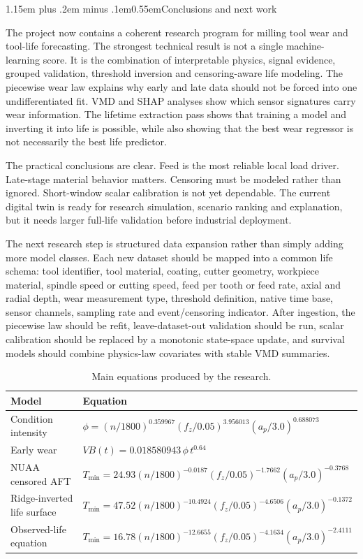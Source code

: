 \documentclass[10pt]{article}
\makeatletter
\newcommand{\vb}{V\!B}
\newcommand{\phii}{\phi}
\renewcommand\section{\@startsection{section}{1}{0pt}%
  {1.15em plus .2em minus .1em}{0.55em}{\normalfont\normalsize\bfseries}}
\makeatother
\begin{document}
\section{Conclusions and next work}

The project now contains a coherent research program for milling tool wear and tool-life forecasting. The strongest technical result is not a single machine-learning score. It is the combination of interpretable physics, signal evidence, grouped validation, threshold inversion and censoring-aware life modeling. The piecewise wear law explains why early and late data should not be forced into one undifferentiated fit. VMD and SHAP analyses show which sensor signatures carry wear information. The lifetime extraction pass shows that training a model and inverting it into life is possible, while also showing that the best wear regressor is not necessarily the best life predictor.

The practical conclusions are clear. Feed is the most reliable local load driver. Late-stage material behavior matters. Censoring must be modeled rather than ignored. Short-window scalar calibration is not yet dependable. The current digital twin is ready for research simulation, scenario ranking and explanation, but it needs larger full-life validation before industrial deployment.

The next research step is structured data expansion rather than simply adding more model classes. Each new dataset should be mapped into a common life schema: tool identifier, tool material, coating, cutter geometry, workpiece material, spindle speed or cutting speed, feed per tooth or feed rate, axial and radial depth, wear measurement type, threshold definition, native time base, sensor channels, sampling rate and event/censoring indicator. After ingestion, the piecewise law should be refit, leave-dataset-out validation should be run, scalar calibration should be replaced by a monotonic state-space update, and survival models should combine physics-law covariates with stable VMD summaries.

\begin{table}[!t]
  \centering
  \caption{Main equations produced by the research.}
  \label{tab:equation-summary}
  \footnotesize
  \begin{tabularx}{\textwidth}{p{3.2cm}Y}
    \toprule
    Model & Equation \\
    \midrule
    Condition intensity &
    \(\phii=(n/1800)^{0.359967}(f_z/0.05)^{3.956013}(a_p/3.0)^{0.688073}\) \\
    Early wear &
    \(\vb(t)=0.018580943\,\phii\,t^{0.64}\) \\
    NUAA censored AFT &
    \(T_{\min}=24.93(n/1800)^{-0.0187}(f_z/0.05)^{-1.7662}(a_p/3.0)^{-0.3768}\) \\
    Ridge-inverted life surface &
    \(T_{\min}=47.52(n/1800)^{-10.4924}(f_z/0.05)^{-4.6506}(a_p/3.0)^{-0.1372}\) \\
    Observed-life equation &
    \(T_{\min}=16.78(n/1800)^{-12.6655}(f_z/0.05)^{-4.1634}(a_p/3.0)^{-2.4111}\) \\
    \bottomrule
  \end{tabularx}
\end{table}
\end{document}
